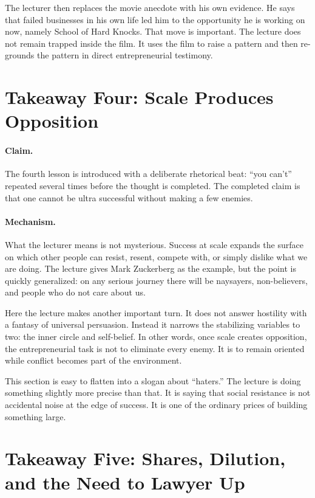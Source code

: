 The lecturer then replaces the movie anecdote with his own evidence. He says that failed businesses in his own life led him to the opportunity he is working on now, namely School of Hard Knocks. That move is important. The lecture does not remain trapped inside the film. It uses the film to raise a pattern and then re-grounds the pattern in direct entrepreneurial testimony.

\section{Takeaway Four: Scale Produces Opposition}

\paragraph{Claim.}
The fourth lesson is introduced with a deliberate rhetorical beat: ``you can't'' repeated several times before the thought is completed. The completed claim is that one cannot be ultra successful without making a few enemies.

\paragraph{Mechanism.}
What the lecturer means is not mysterious. Success at scale expands the surface on which other people can resist, resent, compete with, or simply dislike what we are doing. The lecture gives Mark Zuckerberg as the example, but the point is quickly generalized: on any serious journey there will be naysayers, non-believers, and people who do not care about us.

Here the lecture makes another important turn. It does not answer hostility with a fantasy of universal persuasion. Instead it narrows the stabilizing variables to two: the inner circle and self-belief. In other words, once scale creates opposition, the entrepreneurial task is not to eliminate every enemy. It is to remain oriented while conflict becomes part of the environment.

This section is easy to flatten into a slogan about ``haters.'' The lecture is doing something slightly more precise than that. It is saying that social resistance is not accidental noise at the edge of success. It is one of the ordinary prices of building something large.

\section{Takeaway Five: Shares, Dilution, and the Need to Lawyer Up}

